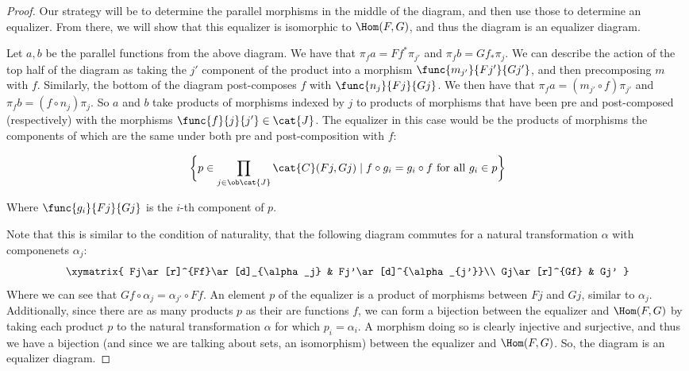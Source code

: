 \documentclass[../../main]{subfiles}
\begin{document}
\begin{proof}
	Our strategy will be to determine the parallel morphisms in the middle of the diagram, and then use those to determine an equalizer. From there, we will show that this equalizer is isomorphic to $\Hom(F,G)$, and thus the diagram is an equalizer diagram.
	
	Let $a,b$ be the parallel functions from the above diagram. We have
	that $\pi_f a = Ff^\ast\pi_{j'}$ and $\pi_f b = Gf_\ast \pi_j$. We can
	describe the action of the top half of the diagram as taking the $j'$
	component of the product into a morphism $\func{m_{j'}}{Fj'}{Gj'}$, and
	then precomposing $m$ with $f$. Similarly, the bottom of the diagram
	post-composes $f$ with $\func{n_j}{Fj}{Gj}$. We then have that $\pi_f a
	= (m_{j'}\circ f)\pi_{j'}$ and $\pi_f b = (f\circ n_j)\pi_j$. So $a$
	and $b$ take products of morphisms indexed by $j$ to products of
	morphisms that have been pre and post-composed (respectively) with the
	morphisms $\func{f}{j}{j'}\in\cat{J}$. The equalizer in this case would
	be the products of morphisms the components of which are the same under
	both pre and post-composition with $f$:
	
	$$\bigg\{p\in\prod\limits_{j\in\ob\cat{J}}\cat{C}(Fj,Gj)\mid f\circ g_i
	= g_i\circ f \text{ for all } g_i\in p\bigg\}$$
	
	Where $\func{g_i}{Fj}{Gj}$ is the $i$-th component of $p$.
	
	Note that this is similar to the condition of naturality, that the
	following diagram commutes for a natural transformation $\alpha$ with
	componenets $\alpha_j$:
	$$
	\xymatrix{
		Fj\ar[r]^{Ff}\ar[d]_{\alpha_j} & Fj'\ar[d]^{\alpha_{j'}}\\
		Gj\ar[r]^{Gf} & Gj'
	}
	$$
	Where we can see that $Gf\circ \alpha_j = \alpha_{j'}\circ Ff$. An
	element $p$ of the equalizer is a product of morphisms between $Fj$ and
	$Gj$, similar to $\alpha_j$. Additionally, since there are as many
	products $p$ as their are functions $f$, we can form a bijection
	between the equalizer and $\Hom(F,G)$ by taking each product $p$ to the
	natural transformation $\alpha$ for which $p_i = \alpha_i$. A morphism
	doing so is clearly injective and surjective, and thus we have a
	bijection (and since we are talking about sets, an isomorphism) between
	the equalizer and $\Hom(F,G)$. So, the diagram is an equalizer diagram.

\end{proof}
\end{document}
